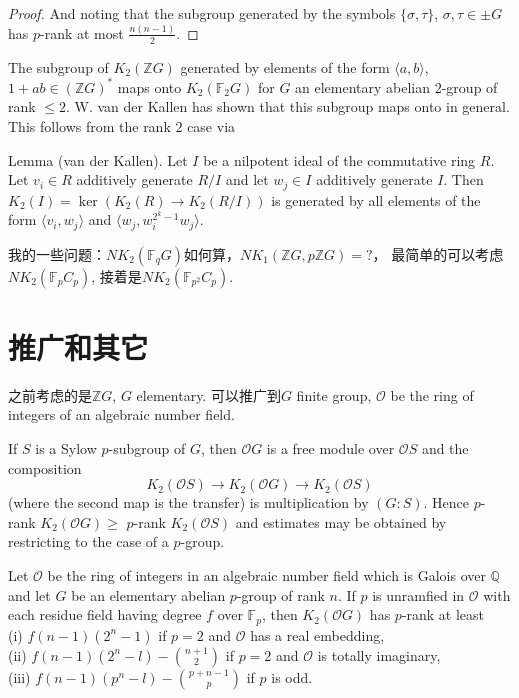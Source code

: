 \begin{proof}
And noting that the subgroup generated by the symbols
$\{\sigma, \tau\}$, $\sigma,\tau \in \pm G$ has $p$-rank at most $\frac{n(n-1)}{2}$.
\end{proof}

\begin{remark}
	The  subgroup of  $K_2(\mathbb{Z} G)$  generated by elements of the form  $ \langle a,b \rangle$,
$1 +ab \in (\mathbb{Z}G)^* $ maps onto $K_2(\mathbb{F}_2 G)$ for $G$ an elementary abelian $2$-group of
rank $\leq 2$. W. van der Kallen has shown that this subgroup maps onto in general. This follows from the rank $2$ case via

Lemma  (van der Kallen).  Let $I$ be a nilpotent ideal of the commutative ring $R$. Let $v_i \in R$ additively generate $R/I$ and let $w_j\in I$ additively generate $I$. Then $K_2(I)=\ker(K_2(R)\longrightarrow K_2(R/I))$ is generated by all elements of the form $\langle v_i , w_j \rangle$ and $\langle w_j, w_i^{2^k-1}w_j \rangle$.
\end{remark}




我的一些问题：$NK_2(\mathbb{F}_q G)$如何算，$NK_1(\mathbb{Z}G,p \mathbb{Z}G)=?$， 最简单的可以考虑$NK_2(\mathbb{F}_p C_p)$, 接着是$NK_2(\mathbb{F}_{p^2} C_p)$.


\section{推广和其它} %
\label{sub:推广和其它}
之前考虑的是$\mathbb{Z}G$, $G$ elementary. 可以推广到$G$ finite group, $\mathcal{O}$ be the ring of integers of an algebraic number field.

If $S$ is a Sylow $p$-subgroup of $G$, then $\mathcal{O}G$ is a free module over $\mathcal{O}S$ and the composition
\[K_2(\mathcal{O}S)\longrightarrow K_2(\mathcal{O}G)\longrightarrow K_2(\mathcal{O}S)\]
(where the second map is the transfer) is multiplication by $(G:S)$. Hence
$p$-rank  $K_2(\mathcal{O}G) \geq$ $p$-rank $K_2(\mathcal{O}S)$  and estimates may be obtained by restricting to the case of a $p$-group. 
\begin{theorem}
	 Let $\mathcal{O}$ be the ring of integers in an algebraic number field which is
Galois over $\mathbb{Q}$ and let $G$ be an elementary abelian $p$-group of rank $n$. If $p$ is unramfied in $\mathcal{O}$ with each residue field having degree $f$ over $\mathbb{F}_p$, then $K_2 (\mathcal{O}G)$ has $p$-rank at least\\
(i)  $f(n - 1) (2^n - 1)$ if $p = 2$  and $\mathcal{O}$ has a real embedding,\\
(ii)  $f(n-1)(2^n- l)-\binom{n+1}{2}$ if $p=2$ and $\mathcal{O}$ is totally imaginary,\\
(iii)  $f(n-1)(p^n-l)-  \binom{p+n-1}{p}$ if $p$ is odd.
\end{theorem}

